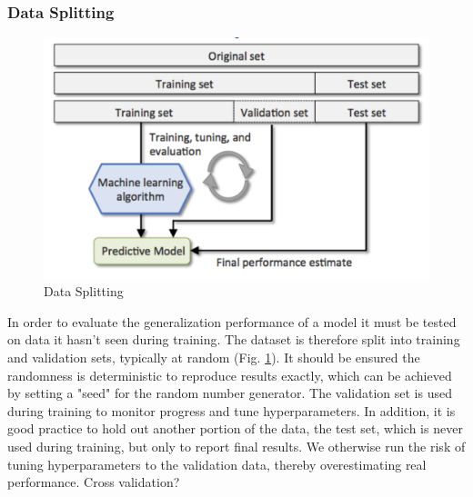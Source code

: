 \subsubsection{Data Splitting}
\begin{figure}[h]
    \includegraphics[width=\linewidth]{chapters/NLP/figures/data_splitting.png}
    \caption{Data Splitting}
    \label{fig:data_splitting}
\end{figure}
In order to evaluate the generalization performance of a model it must be tested on data it hasn't seen during training.
The dataset is therefore split into training and validation sets, typically at random (Fig. \ref{fig:data_splitting}).
It should be ensured the randomness is deterministic to reproduce results exactly, which can be achieved by setting a "seed" for the random number generator.
The validation set is used during training to monitor progress and tune hyperparameters.
In addition, it is good practice to hold out another portion of the data, the test set, which is never used during training, but only to report final results.
We otherwise run the risk of tuning hyperparameters to the validation data, thereby overestimating real performance.
Cross validation?
